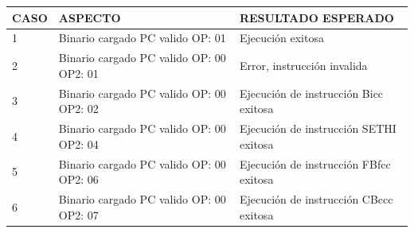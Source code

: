 \documentclass[
  11pt, %
  codirector, %
]{charter}
\begin{document}
\begin{table}[h!]
	\centering
	\begin{tabular}{ | m{2cm} | m{5cm} | m{7cm} | }
		\hline
		\rowcolor{gray!50} %
		\textbf{CASO} & \textbf{ASPECTO} & \textbf{RESULTADO ESPERADO} \\ \hline
    1 & Binario cargado \newline
        PC valido \newline
        OP: 01 \newline
      & Ejecución exitosa \\ \hline

    2 & Binario cargado \newline
        PC valido \newline
        OP: 00 \newline
        OP2: 01 \newline
      & Error, instrucción invalida \\ \hline

    3 & Binario cargado \newline
        PC valido \newline
        OP: 00 \newline
        OP2: 02 \newline
      & Ejecución de instrucción Bicc exitosa \\ \hline

    4 & Binario cargado \newline
        PC valido \newline
        OP: 00 \newline
        OP2: 04 \newline
      & Ejecución de instrucción SETHI exitosa \\ \hline

    5 & Binario cargado \newline
        PC valido \newline
        OP: 00 \newline
        OP2: 06 \newline
      & Ejecución de instrucción FBfcc exitosa \\ \hline

    6 & Binario cargado \newline
        PC valido \newline
        OP: 00 \newline
        OP2: 07 \newline
      & Ejecución de instrucción CBccc exitosa \\ \hline


	\end{tabular}

  \newpage

\end{table}
\end{document}
